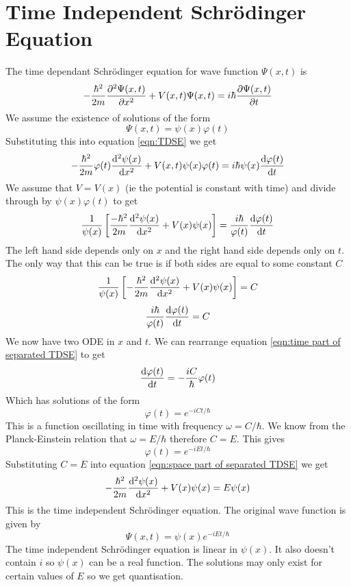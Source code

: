 \documentclass{article}
\begin{document}
    \section{Time Independent Schr\"odinger Equation}
    The time dependant Schr\"odinger equation for wave function \(\Psi(x, t)\) is
    \begin{equation}\label{eqn:TDSE}
        -\frac{\hbar^2}{2m}\pdv[2]{\Psi(x, t)}{x} + V(x, t)\Psi(x, t) = i\hbar\pdv{\Psi(x, t)}{t}
    \end{equation}
    We assume the existence of solutions of the form
    \[\Psi(x, t) = \psi(x)\varphi(t)\]
    Substituting this into equation \ref{eqn:TDSE} we get
    \[-\frac{\hbar^2}{2m} \varphi(t) \dv[2]{\psi(x)}{x} + V(x, t) \psi(x) \varphi(t) = i\hbar \psi(x) \dv{\varphi(t)}{t}\]
    We assume that \(V = V(x)\) (ie the potential is constant with time) and divide through by \(\psi(x)\varphi(t)\) to get
    \[\frac{1}{\psi(x)}\left[\frac{-\hbar^2}{2m} \dv[2]{\psi(x)}{x} + V(x)\psi(x)\right] = \frac{i\hbar}{\varphi(t)}\dv{\varphi(t)}{t}\]
    The left hand side depends only on \(x\) and the right hand side depends only on \(t\).
    The only way that this can be true is if both sides are equal to some constant \(C\)
    \begin{equation}\label{eqn:space part of separated TDSE}
        \frac{1}{\psi(x)}\left[-\frac{\hbar^2}{2m}\dv[2]{\psi(x)}{x} + V(x)\psi(x)\right] = C
    \end{equation}
    \begin{equation}\label{eqn:time part of separated TDSE}
        \frac{i\hbar}{\varphi(t)}\dv{\varphi(t)}{t} = C
    \end{equation}
    We now have two ODE in \(x\) and \(t\).
    We can rearrange equation \ref{eqn:time part of separated TDSE} to get
    \[\dv{\varphi(t)}{t} = -\frac{iC}{\hbar}\varphi(t)\]
    Which has solutions of the form
    \[\varphi(t) = e^{-iCt/\hbar}\]
    This is a function oscillating in time with frequency \(\omega = C/\hbar\).
    We know from the Planck-Einstein relation that \(\omega = E/\hbar\) therefore \(C = E\).
    This gives
    \[\varphi(t) = e^{-iEt/\hbar}\]
    Substituting \(C = E\)  into equation \ref{eqn:space part of separated TDSE} we get
    \[-\frac{\hbar^2}{2m}\dv[2]{\psi(x)}{x} + V(x)\psi(x) = E\psi(x)\]
    This is the time independent Schr\"odinger equation.
    The original wave function is given by
    \[\Psi(x, t) = \psi(x)e^{-iEt/\hbar}\]
    The time independent Schr\"odinger equation is linear in \(\psi(x)\).
    It also doesn't contain \(i\) so \(\psi(x)\) can be a real function.
    The solutions may only exist for certain values of \(E\) so we get quantisation.
    
\end{document}
